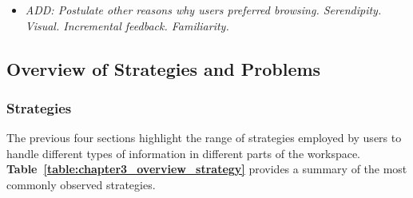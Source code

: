 \begin{footnotesize}

\begin{itemize}
	\item \textit{ADD: Postulate other reasons why users preferred browsing.  Serendipity. Visual. Incremental feedback. Familiarity.}
\end{itemize}

\end{footnotesize}






\newpage








\newpage
\subsection{Overview of Strategies and Problems}
\label{exp-study:qual_overview}

\subsubsection{Strategies}

\noindent
The previous four sections highlight the range of strategies employed by users to handle different types of information in different parts of the workspace.
\textbf{Table~\ref{table:chapter3_overview_strategy}} provides a summary of the most commonly observed strategies.
\\

